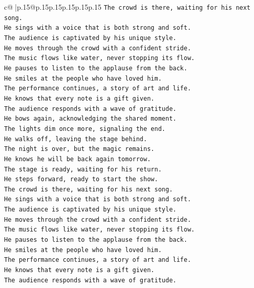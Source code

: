 \documentclass{article}
\begin{document}
{\begin{supertabular}{c@{$\;$}|p{.15\linewidth}@{}p{.15\linewidth}p{.15\linewidth}p{.15\linewidth}p{.15\linewidth}p{.15\linewidth}}
{{{\texttt{The crowd is there, waiting for his next song.} \\
\texttt{He sings with a voice that is both strong and soft.} \\
\texttt{The audience is captivated by his unique style.} \\
\texttt{He moves through the crowd with a confident stride.} \\
\texttt{The music flows like water, never stopping its flow.} \\
\texttt{He pauses to listen to the applause from the back.} \\
\texttt{He smiles at the people who have loved him.} \\
\texttt{The performance continues, a story of art and life.} \\
\texttt{He knows that every note is a gift given.} \\
\texttt{The audience responds with a wave of gratitude.} \\
\texttt{He bows again, acknowledging the shared moment.} \\
\texttt{The lights dim once more, signaling the end.} \\
\texttt{He walks off, leaving the stage behind.} \\
\texttt{The night is over, but the magic remains.} \\
\texttt{He knows he will be back again tomorrow.} \\
\texttt{The stage is ready, waiting for his return.} \\
\texttt{He steps forward, ready to start the show.} \\
\texttt{The crowd is there, waiting for his next song.} \\
\texttt{He sings with a voice that is both strong and soft.} \\
\texttt{The audience is captivated by his unique style.} \\
\texttt{He moves through the crowd with a confident stride.} \\
\texttt{The music flows like water, never stopping its flow.} \\
\texttt{He pauses to listen to the applause from the back.} \\
\texttt{He smiles at the people who have loved him.} \\
\texttt{The performance continues, a story of art and life.} \\
\texttt{He knows that every note is a gift given.} \\
\texttt{The audience responds with a wave of gratitude.} \\
}}}
\end{supertabular}}
\end{document}
